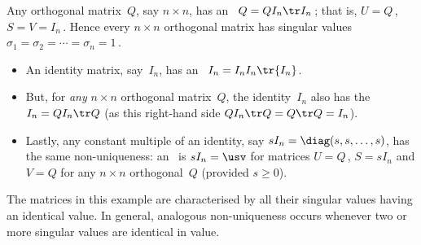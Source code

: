 \begin{example} \label{eg:svdorthog}
Any orthogonal matrix~\(Q\), say \(n\times n\), has an \svd\ \(Q=QI_n\tr I_n\)\,; that is, \(U=Q\)\,, \(S=V=I_n\)\,. 
Hence every \(n\times n\) orthogonal matrix has singular values \(\sigma_1=\sigma_2=\cdots=\sigma_n=1\)\,.
\end{example}


\begin{example} \label{eg:svdnonuniq}
\begin{itemize}
\item An identity matrix, say~\(I_n\), has an \svd\ \(I_n=I_nI_n\tr{I_n}\).  
\item But, for \emph{any} \(n\times n\) orthogonal matrix~\(Q\), the identity~\(I_n\) also has the \svd\ \(I_n=QI_n\tr Q\) (as this right-hand side \(QI_n\tr Q=Q\tr Q=I_n\)).
\item Lastly, any constant multiple of an identity, say \(sI_n=\diag(s,s,\ldots,s)\), has the same non-uniqueness: an \svd\ is \(sI_n=\usv\) for matrices \(U=Q\)\,, \(S=sI_n\) and \(V=Q\) for any \(n\times n\) orthogonal~\(Q\) (provided \(s\geq0\)).
\end{itemize}
The matrices in this example are characterised by all their singular values having an identical value. 
In general, analogous non-uniqueness occurs whenever two or more singular values are identical in value.
\end{example}





